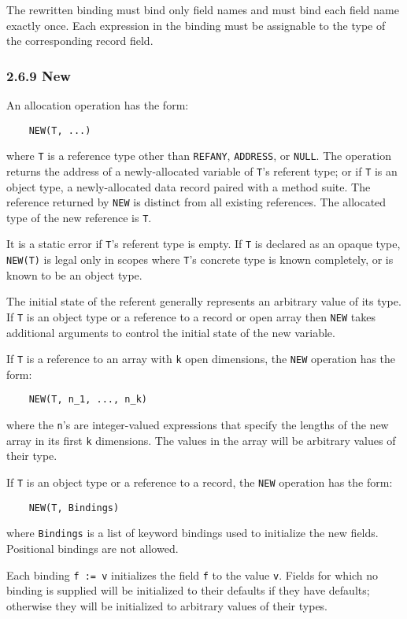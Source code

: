 \documentclass[10pt]{article}
\begin{document}
The rewritten binding must bind only field names and must bind each field name
exactly once.  Each expression in the binding must be assignable to the type
of the corresponding record field.

\subsubsection*{2.6.9 New}

An allocation operation has the form:
\begin{verbatim}
    NEW(T, ...)
\end{verbatim}
where \verb|T| is a reference type other than \verb|REFANY|, \verb|ADDRESS|,
or \verb|NULL|.  The operation returns the address of a newly-allocated
variable of \verb|T|'s referent type; or if \verb|T| is an object type, a
newly-allocated data record paired with a method suite.  The reference
returned by \verb|NEW| is distinct from all existing references.  The
allocated type of the new reference is \verb|T|.

It is a static error if \verb|T|'s referent type is empty.  If \verb|T| is
declared as an opaque type, \verb|NEW(T)| is legal only in scopes where
\verb|T|'s concrete type is known completely, or is known to be an object
type.

The initial state of the referent generally represents an arbitrary value of
its type.  If \verb|T| is an object type or a reference to a record or open
array then \verb|NEW| takes additional arguments to control the initial state
of the new variable.

If \verb|T| is a reference to an array with \verb|k| open dimensions, the
\verb|NEW| operation has the form:
\begin{verbatim}
    NEW(T, n_1, ..., n_k)
\end{verbatim}
where the \verb|n|'s are integer-valued expressions that specify the lengths
of the new array in its first \verb|k| dimensions.  The values in the array
will be arbitrary values of their type.

If \verb|T| is an object type or a reference to a record, the \verb|NEW|
operation has the form:
\begin{verbatim}
    NEW(T, Bindings)
\end{verbatim}
where \verb|Bindings| is a list of keyword bindings used to initialize the new
fields.  Positional bindings are not allowed.

Each binding \verb|f := v| initializes the field \verb|f| to the value
\verb|v|.  Fields for which no binding is supplied will be initialized to
their defaults if they have defaults; otherwise they will be initialized to
arbitrary values of their types.
\end{document}
